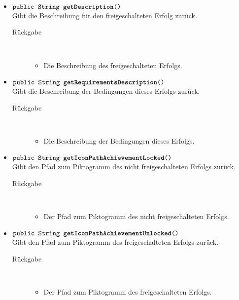 \begin{description}
\begin{itemize}
\item $\texttt{public String \textbf{getDescription}()}$ \\ Gibt die Beschreibung für den freigeschalteten Erfolg zurück.
		\begin{description}
			\item[Rückgabe] \hfill \\
			\vspace{-.8cm}
			\begin{itemize}
				\item Die Beschreibung des freigeschalteten Erfolgs.
			\end{itemize}
		\end{description}

\item $\texttt{public String \textbf{getRequirementsDescription}()}$ \\ Gibt die Beschreibung der Bedingungen dieses Erfolgs zurück.
		\begin{description}
			\item[Rückgabe] \hfill \\
			\vspace{-.8cm}
			\begin{itemize}
				\item Die Beschreibung der Bedingungen dieses Erfolgs.
			\end{itemize}
		\end{description}

\item $\texttt{public String \textbf{getIconPathAchievementLocked}()}$ \\ Gibt den Pfad zum Piktogramm des nicht freigeschalteten Erfolgs zurück.
		\begin{description}
			\item[Rückgabe] \hfill \\
			\vspace{-.8cm}
			\begin{itemize}
				\item Der Pfad zum Piktogramm des nicht freigeschalteten Erfolgs.
			\end{itemize}
		\end{description}

\item $\texttt{public String \textbf{getIconPathAchievementUnlocked}()}$ \\ Gibt den Pfad zum Piktogramm des freigeschalteten Erfolgs zurück.
		\begin{description}
			\item[Rückgabe] \hfill \\
			\vspace{-.8cm}
			\begin{itemize}
				\item Der Pfad zum Piktogramm des freigeschalteten Erfolgs.
			\end{itemize}
		\end{description}


\end{itemize}
\end{description}

